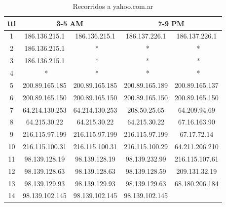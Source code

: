\documentclass[a4paper]{article}
\begin{document}
 
 
  \begin{table}[!htb]
 	\begin{center}
 	\begin{tabular}{|c|c|c|c|c|}
 	  \hline
 	  ttl & \multicolumn{2}{|c|}{3-5 AM} & \multicolumn{2}{|c|}{7-9 PM}\\ \hline
	  1 & 186.136.215.1 & 186.136.215.1 & 186.137.226.1 & 186.137.226.1\\ \hline
	  2 & 186.136.215.1 &  \ * & \ *  &  \ * \\ \hline
	  3 & 186.136.215.1 &  \ *  &  \ *  &  \ * \\ \hline
	  4 &  \ *  &  \ *  &  \ *  &  \ * \\ \hline
	  5 & 200.89.165.185 & 200.89.165.185 & 200.89.165.189 & 200.89.165.137\\ \hline
	  6 & 200.89.165.150 & 200.89.165.150 & 200.89.165.150 & 200.89.165.150\\ \hline
	  7 & 64.214.130.253 & 64.214.130.253 & 208.50.25.65 & 64.209.94.69\\ \hline
	  8 & 64.215.30.22 & 64.215.30.22 & 64.215.30.22 & 67.16.163.90\\ \hline
	  9 & 216.115.97.199 & 216.115.97.199 & 216.115.97.199 & 67.17.72.14\\ \hline
	  10 & 216.115.100.31 & 216.115.100.31 & 216.115.100.29 & 64.211.206.210\\ \hline
	  11 & 98.139.128.19 & 98.139.128.19 & 98.139.232.99 & 216.115.107.61\\ \hline
	  12 & 98.139.128.63 & 98.139.128.63 & 98.139.128.59 & 209.131.32.19\\ \hline
	  13 & 98.139.129.93 & 98.139.129.93 & 98.139.129.63 & 68.180.206.184\\ \hline
	  14 & 98.139.102.145 & 98.139.102.145 & 98.139.102.145 & \\ \hline

 	 \end{tabular}   
 	 \vspace{0pt}
 	 \caption{Recorridos a yahoo.com.ar}
 	\end{center}
 	\label{tab:yahoo.com.ar}
 \end{table}
 
\end{document}

